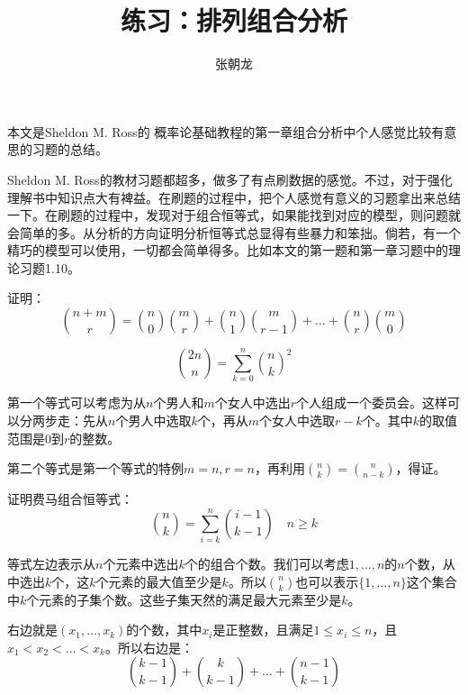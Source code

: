 \documentclass[10pt,a4paper,UTF8]{article}
\author{张朝龙}
\date{}
\title{练习：排列组合分析}
\begin{document}
\maketitle
本文是Sheldon M. Ross的 概率论基础教程的第一章组合分析中个人感觉比较有意思的习题的总结。

Sheldon M. Ross的教材习题都超多，做多了有点刷数据的感觉。不过，对于强化理解书中知识点大有裨益。在刷题的过程中，把个人感觉有意义的习题拿出来总结一下。在刷题的过程中，发现对于组合恒等式，如果能找到对应的模型，则问题就会简单的多。从分析的方向证明分析恒等式总显得有些暴力和笨拙。倘若，有一个精巧的模型可以使用，一切都会简单得多。比如本文的第一题和第一章习题中的理论习题1.10。



\begin{tikzproblem}
证明：
\begin{equation}
\label{eq:1}
\binom{n+m}{r} = \binom{n}{0}\binom{m}{r} + \binom{n}{1}\binom{m}{r-1} + \ldots  + \binom{n}{r}\binom{m}{0}
\end{equation}

\begin{equation}
\label{eq:2}
\binom{2n}{n} = \sum_{k=0}^{n}\binom{n}{k}^{2}
\end{equation}
\end{tikzproblem}

\begin{tikzanswer}
第一个等式可以考虑为从\(n\)个男人和\(m\)个女人中选出\(r\)个人组成一个委员会。这样可以分两步走：先从\(n\)个男人中选取\(k\)个，再从\(m\)个女人中选取\(r-k\)个。其中\(k\)的取值范围是\(0\)到\(r\)的整数。

第二个等式是第一个等式的特例\(m=n,r=n\)，再利用\(\binom{n}{k} = \binom{n}{n-k}\)，得证。
\end{tikzanswer}

\begin{tikzproblem}
证明费马组合恒等式：
\begin{equation}
\label{eq:3}
\binom{n}{k} = \sum_{i=k}^{n}\binom{i-1}{k-1}\quad n\geq k
\end{equation}
\end{tikzproblem}

\begin{tikzanswer}
等式左边表示从\(n\)个元素中选出\(k\)个的组合个数。我们可以考虑\(1,\ldots ,n\)的\(n\)个数，从中选出\(k\)个，这\(k\)个元素的最大值至少是\(k\)。所以\(\binom{n}{k}\)也可以表示\(\{1,\ldots ,n\}\)这个集合中\(k\)个元素的子集个数。这些子集天然的满足最大元素至少是\(k\)。

右边就是\((x_{1},\ldots ,x_{k})\)的个数，其中\(x_{i}\)是正整数，且满足\(1\leq x_{i} \leq n\)，且\(x_{1} < x_{2} < \ldots < x_{k}\)。所以右边是：
\begin{equation}
\label{eq:4}
\binom{k-1}{k-1} + \binom{k}{k-1} + \ldots + \binom{n-1}{k-1}
\end{equation}
\end{tikzanswer}
\end{document}
